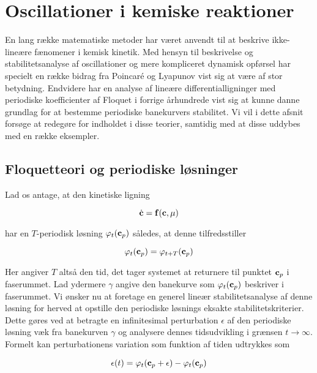 \chapter{Oscillationer i kemiske reaktioner}
En lang r{\ae}kke matematiske metoder har v{\ae}ret anvendt
til at beskrive ikke-line{\ae}re f{\ae}nomener i kemisk
kinetik. Med hensyn til beskrivelse og
stabili\-tets\-ana\-lyse af oscillationer og mere
kompliceret dynamisk opf{\o}rsel har specielt en r{\ae}kke
bidrag fra Poincar\'{e} og Lyapunov \cite{PoinOrig} vist
sig at v{\ae}re af stor betydning. Endvidere har en
ana\-lyse af line{\ae}re differentiallig\-ninger med
periodiske koefficienter af Floquet i forrige
{\aa}rhundrede vist sig at kunne danne grundlag for at
bestemme periodiske banekurvers stabilitet. Vi vil i dette
afsnit fors{\o}ge at redeg{\o}re for indholdet i disse
teorier, samtidig med at disse uddybes med en r{\ae}kke
eksempler.

\section{Floquetteori og periodiske l{\o}sninger}
Lad os antage, at den kinetiske lig\-ning

\begin{equation}
 \dot{\bf c} = {\bf f}({\bf c},\mu)  
 \label{eq:OdeBasic}
\end{equation}

har en $T$-periodisk l{\o}sning $\varphi_t({\bf c}_p)$
s{\aa}ledes, at denne tilfredsstiller

\begin{equation}
 \varphi_t({\bf c}_p) = \varphi_{t+T}({\bf c}_p)
\end{equation}

Her angiver $T$ alts{\aa} den tid, det tager sy\-stemet at
returnere til punktet ${\bf c}_p$ i faserummet. Lad
ydermere $\gamma$ angive den banekurve som $\varphi_t({\bf
c}_p)$ beskriver i faserummet. Vi {\o}nsker nu at foretage
en generel line{\ae}r stabilitets\-ana\-lyse af denne
l{\o}sning for herved at opstille den periodiske
l{\o}snings eksakte stabilitets\-kriterier. Dette g{\o}res
ved at betragte en infinitesimal perturbation $\epsilon$ af
den periodiske l{\o}sning v{\ae}k fra banekurven $\gamma$
og ana\-lysere dennes tidsudvikling i gr{\ae}nsen $t
\rightarrow \infty$. Formelt kan perturbationens variation
som funktion af tiden udtrykkes som

\begin{equation}
 \epsilon(t) = \varphi_t({\bf c}_p+\epsilon) - \varphi_{t}({\bf c}_p)
\end{equation}

